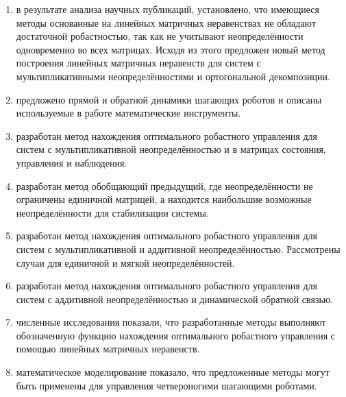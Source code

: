 \begin{enumerate}
  \item в результате анализа научных публикаций, установлено, что имеющиеся методы основанные на линейных матричных неравенствах не обладают достаточной робастностью, так как не учитывают неопределённости одновременно во всех матрицах. Исходя из этого предложен новый метод построения линейных матричных неравенств для систем с мультипликативными неопределённостями и ортогональной декомпозиции.  
  \item предложено прямой и обратной динамики шагающих роботов и описаны используемые в работе математические инструменты.
  \item разработан метод нахождения оптимального робастного управления для систем с мультипликативной неопределённостью и в матрицах состояния, управления и наблюдения. 
  \item разработан метод обобщающий предыдущий, где неопределённости не ограничены единичной матрицей, а находится наибольшие возможные неопределённости для стабилизации системы.
  \item разработан метод нахождения оптимального робастного управления для систем с мультипликативной и аддитивной неопределённостью. Рассмотрены случаи для единичной и мягкой неопределённостей.
  \item разработан метод нахождения оптимального робастного управления для систем с аддитивной неопределённостью и динамической обратной связью.
  \item численные исследования показали, что разработанные методы выполняют обозначенную функцию нахождения оптимального робастного управления с помощью линейных матричных неравенств.
  \item математическое моделирование показало, что предложенные методы могут быть применены для управления четвероногими шагающими роботами. 
\end{enumerate}
